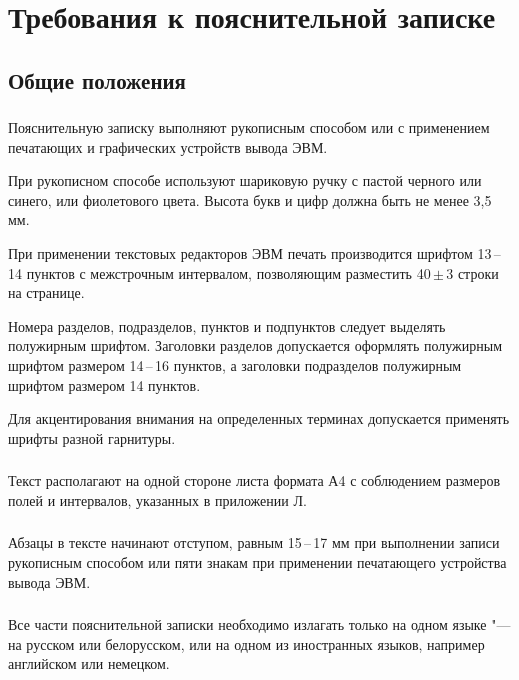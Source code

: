 \newcommand{\byr}{Br}

\section{Требования к пояснительной записке}

\subsection{Общие положения}

\subsubsection{} 
Пояснительную  записку  выполняют  рукописным  способом  или  с применением печатающих и графических устройств вывода ЭВМ. 

При рукописном способе используют шариковую ручку с пастой черного или синего, или фиолетового цвета. Высота букв и цифр должна быть не менее 3,5 мм. 

При применении текстовых редакторов ЭВМ печать производится шрифтом 13\,--\,14  пунктов  с  межстрочным  интервалом,  позволяющим  разместить  
40\,\( \pm \)\,3 строки на странице. 

Номера  разделов,  подразделов,  пунктов и подпунктов следует выделять полужирным  шрифтом.  Заголовки  разделов  допускается  оформлять  полужирным шрифтом размером 14\,--\,16 пунктов, а заголовки подразделов полужирным шрифтом размером 14 пунктов. 

Для  акцентирования  внимания  на  определенных  терминах  допускается применять шрифты разной гарнитуры. 

\subsubsection{}
Текст располагают на одной стороне листа формата А4 с соблюдением размеров полей и интервалов, указанных в приложении Л.

\subsubsection{}
Абзацы в тексте начинают отступом, равным 15\,--\,17 мм при выполнении  записи  рукописным  способом  или  пяти  знакам  при  применении  печатающего устройства вывода ЭВМ.

\subsubsection{} 
Все  части  пояснительной  записки  необходимо  излагать  только  на одном языке "--- на русском или белорусском, или на одном из иностранных языков, например английском или немецком.

